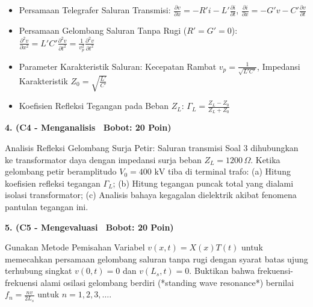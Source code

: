 \documentclass[10pt,a4paper]{article}
\begin{document}
\vfill

\begin{tcolorbox}[colback=unibblue!3,colframe=unibblue,colbacktitle=unibblue,coltitle=white,boxrule=0.6pt,arc=2pt,left=6pt,right=6pt,top=3pt,bottom=3pt,title=\textbf{\scriptsize FORMULA RUJUKAN TEKNIS \& STANDAR INDUSTRI TERKAIT}]
  \scriptsize
  \begin{itemize}[leftmargin=*, nosep]
  \item Persamaan Telegrafer Saluran Transmisi: $\frac{\partial v}{\partial x} = -R' i - L' \frac{\partial i}{\partial t}$, \quad $\frac{\partial i}{\partial x} = -G' v - C' \frac{\partial v}{\partial t}$
  \item Persamaan Gelombang Saluran Tanpa Rugi ($R'=G'=0$): $\frac{\partial^2 v}{\partial x^2} = L' C' \frac{\partial^2 v}{\partial t^2} = \frac{1}{v_p^2} \frac{\partial^2 v}{\partial t^2}$
  \item Parameter Karakteristik Saluran: Kecepatan Rambat $v_p = \frac{1}{\sqrt{L'C'}}$, Impedansi Karakteristik $Z_0 = \sqrt{\frac{L'}{C'}}$
  \item Koefisien Refleksi Tegangan pada Beban $Z_L$: $\Gamma_L = \frac{Z_L - Z_0}{Z_L + Z_0}$
\end{itemize}
\end{tcolorbox}

\newpage

\par
\vspace{1mm}

\noindent\textbf{4. (C4 - Menganalisis \textbar\ Bobot: 20 Poin)}\par\vspace{0.8mm}
{\footnotesize Analisis Refleksi Gelombang Surja Petir: Saluran transmisi Soal 3 dihubungkan ke transformator daya dengan impedansi surja beban $Z_L = 1200\,\Omega$. Ketika gelombang petir beramplitudo $V_0 = 400\text{ kV}$ tiba di terminal trafo: (a) Hitung koefisien refleksi tegangan $\Gamma_L$; (b) Hitung tegangan puncak total yang dialami isolasi transformator; (c) Analisis bahaya kegagalan dielektrik akibat fenomena pantulan tegangan ini.}\par

\vspace{3.5mm}

\noindent\textbf{5. (C5 - Mengevaluasi \textbar\ Bobot: 20 Poin)}\par\vspace{0.8mm}
{\footnotesize Gunakan Metode Pemisahan Variabel $v(x,t) = X(x) T(t)$ untuk memecahkan persamaan gelombang saluran tanpa rugi dengan syarat batas ujung terhubung singkat $v(0,t) = 0$ dan $v(L_s,t) = 0$. Buktikan bahwa frekuensi-frekuensi alami osilasi gelombang berdiri (*standing wave resonance*) bernilai $f_n = \frac{n v}{2 L_s}$ untuk $n = 1, 2, 3, \dots$.}\par
\end{document}
